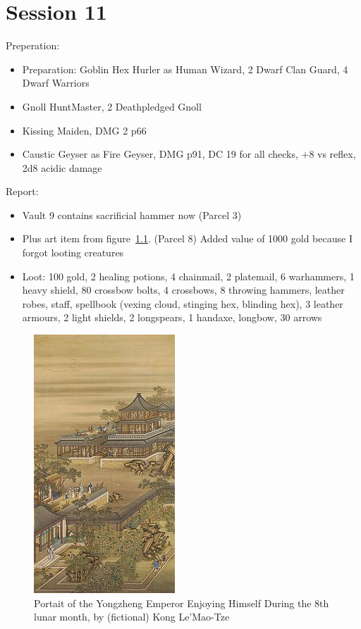 \chapter{Session 11}
Preperation:
\begin{itemize}
\item Preparation: Goblin Hex Hurler as Human Wizard, 2 Dwarf Clan Guard, 4 Dwarf Warriors
\item Gnoll HuntMaster, 2 Deathpledged Gnoll 
\item Kissing Maiden, DMG 2 p66
\item Caustic Geyser as Fire Geyser, DMG p91, DC 19 for all checks, +8 vs reflex, 2d8 acidic damage
\end{itemize}
Report:
\begin{itemize}
\item Vault 9 contains sacrificial hammer now (Parcel 3)
\item Plus art item from figure~\ref{fig:emperor}. (Parcel 8) Added value of 1000 gold because I forgot looting creatures
\item Loot: 100 gold, 2 healing potions, 4 chainmail, 2 platemail, 6 warhammers, 1 heavy shield, 80 crossbow bolts, 4 crossbows, 8 throwing hammers, leather robes, staff, spellbook (vexing cloud, stinging hex, blinding hex), 3 leather armours, 2 light shields, 2 longspears, 1 handaxe, longbow, 30 arrows
\end{itemize}

\begin{figure}[hb]
    \centering
    \includegraphics{fig/Portraits_of_the_Yongzheng_Emperor_Enjoying_Himself_during_the_8th_lunar_month.jpg}
    \caption{\label{fig:emperor} Portait of the Yongzheng Emperor Enjoying Himself During the 8th lunar month, by (fictional) Kong Le'Mao-Tze}
\end{figure}

